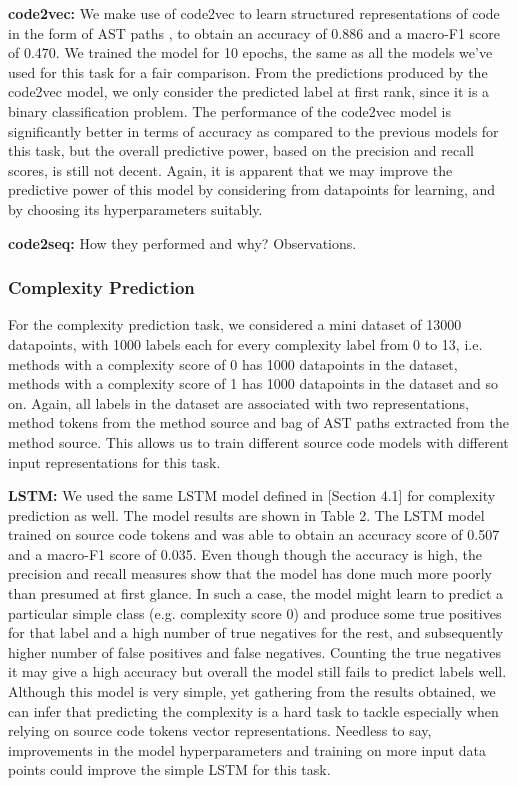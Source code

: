 \documentclass[sigplan,review,anonymous]{acmart}\settopmatter{printfolios=true,printccs=false,printacmref=false}
\begin{document}
\noindent
\textbf{code2vec: } We make use of code2vec to learn structured representations of code in the form of AST paths \cite{code2vec}, to obtain an accuracy of 0.886 and a macro-F1 score of 0.470. We trained the model for 10 epochs, the same as all the models we've used for this task for a fair comparison. From the predictions produced by the code2vec model, we only consider the predicted label at first rank, since it is a binary classification problem. The performance of the code2vec model is significantly better in terms of accuracy as compared to the previous models for this task, but the overall predictive power, based on the precision and recall scores, is still not decent. Again, it is apparent that we may improve the predictive power of this  model by considering from datapoints for learning, and by choosing its hyperparameters suitably. \newline

\noindent
\textbf{code2seq: } How they performed and why? Observations.

\subsubsection{Complexity Prediction}
For the complexity prediction task, we considered a mini dataset of 13000 datapoints, with 1000 labels each for every complexity label from 0 to 13, i.e. methods with a complexity score of 0 has 1000 datapoints in the dataset, methods with a complexity score of 1 has 1000 datapoints in the dataset and so on. Again, all labels in the dataset are associated with two representations, method tokens from the method source and bag of AST paths extracted from the method source. This allows us to train different source code models with different input representations for this task. \newline

\noindent
\textbf{LSTM: } We used the same LSTM model defined in [Section 4.1] for complexity prediction as well. The model results are shown in Table 2. The LSTM model trained on source code tokens and was able to obtain an accuracy score of 0.507 and a macro-F1 score of 0.035. Even though though the accuracy is high, the precision and recall measures show that the model has done much more poorly than presumed at first glance. In such a case, the model might learn to predict a particular simple class (e.g. complexity score 0) and produce some true positives for that label and a high number of true negatives for the rest, and subsequently higher number of false positives and false negatives. Counting the true negatives it may give a high accuracy but overall the model still fails to predict labels well. Although this model is very simple, yet gathering from the results obtained, we can infer that predicting the complexity is a hard task to tackle especially when relying on source code tokens vector representations. Needless to say, improvements in the model hyperparameters and training on more input data points could improve the simple LSTM for this task. \newline
\end{document}
